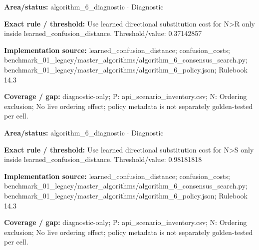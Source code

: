\begin{tcolorbox}[enhanced,breakable,colback=white,colframe=Muted!45,boxrule=0.45pt,arc=1.5pt,left=6pt,right=6pt,top=5pt,bottom=5pt,title={\texttt{A6-LEARNED-SUBSTITUTION-N-R}},title after break={\texttt{A6-LEARNED-SUBSTITUTION-N-R}\ (continued)},fonttitle=\headingfont\bfseries\color{Navy},coltitle=Navy]
\textbf{Area/status:} algorithm\_\allowbreak{}6\_\allowbreak{}diagnostic $\boldsymbol{\cdot}$ Diagnostic\par
\smallskip
\textbf{Exact rule / threshold:} Use learned directional substitution cost for N>R only inside learned\_\allowbreak{}confusion\_\allowbreak{}distance. Threshold/\allowbreak{}value: 0.37142857\par
\smallskip
\textbf{Implementation source:} learned\_\allowbreak{}confusion\_\allowbreak{}distance; confusion\_\allowbreak{}costs; benchmark\_\allowbreak{}01\_\allowbreak{}legacy/\allowbreak{}master\_\allowbreak{}algorithms/\allowbreak{}algorithm\_\allowbreak{}6\_\allowbreak{}consensus\_\allowbreak{}search.py; benchmark\_\allowbreak{}01\_\allowbreak{}legacy/\allowbreak{}master\_\allowbreak{}algorithms/\allowbreak{}algorithm\_\allowbreak{}6\_\allowbreak{}policy.json; Rulebook 14.3\par
\smallskip
\textbf{Coverage / gap:} diagnostic-only; P: api\_\allowbreak{}scenario\_\allowbreak{}inventory.csv; N: Ordering exclusion; No live ordering effect; policy metadata is not separately golden-tested per cell.
\end{tcolorbox}
\begin{tcolorbox}[enhanced,breakable,colback=white,colframe=Muted!45,boxrule=0.45pt,arc=1.5pt,left=6pt,right=6pt,top=5pt,bottom=5pt,title={\texttt{A6-LEARNED-SUBSTITUTION-N-S}},title after break={\texttt{A6-LEARNED-SUBSTITUTION-N-S}\ (continued)},fonttitle=\headingfont\bfseries\color{Navy},coltitle=Navy]
\textbf{Area/status:} algorithm\_\allowbreak{}6\_\allowbreak{}diagnostic $\boldsymbol{\cdot}$ Diagnostic\par
\smallskip
\textbf{Exact rule / threshold:} Use learned directional substitution cost for N>S only inside learned\_\allowbreak{}confusion\_\allowbreak{}distance. Threshold/\allowbreak{}value: 0.98181818\par
\smallskip
\textbf{Implementation source:} learned\_\allowbreak{}confusion\_\allowbreak{}distance; confusion\_\allowbreak{}costs; benchmark\_\allowbreak{}01\_\allowbreak{}legacy/\allowbreak{}master\_\allowbreak{}algorithms/\allowbreak{}algorithm\_\allowbreak{}6\_\allowbreak{}consensus\_\allowbreak{}search.py; benchmark\_\allowbreak{}01\_\allowbreak{}legacy/\allowbreak{}master\_\allowbreak{}algorithms/\allowbreak{}algorithm\_\allowbreak{}6\_\allowbreak{}policy.json; Rulebook 14.3\par
\smallskip
\textbf{Coverage / gap:} diagnostic-only; P: api\_\allowbreak{}scenario\_\allowbreak{}inventory.csv; N: Ordering exclusion; No live ordering effect; policy metadata is not separately golden-tested per cell.
\end{tcolorbox}
